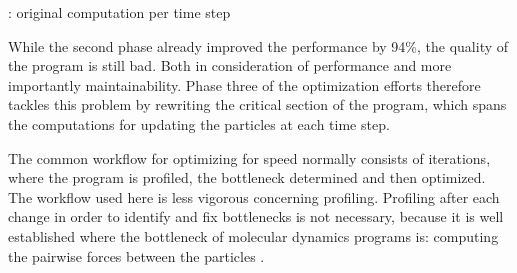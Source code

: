 \documentclass[twoside,11pt]{article}
\begin{document}
\begin{algorithm} %
  \caption{: original computation per time step}
  \label{alg:old}

  \begin{algorithmic}[1]
    \ENDFOR

    \ENDFOR

    \ENDFOR

    \ENDFOR

    \ENDFOR

    \ENDFOR

  \end{algorithmic}
\end{algorithm} %

While the second phase already improved the performance by 94\%,
the quality of the program is still bad.
Both in consideration of performance and more importantly
maintainability.
Phase three of the optimization efforts therefore tackles this
problem by rewriting the critical section of the program, which spans
the computations for updating the particles at each time step.

The common workflow for optimizing for speed normally consists of
iterations, where the program is profiled, the bottleneck determined
and then optimized.
The workflow used here is less vigorous concerning profiling.
Profiling after each change in order to identify and fix bottlenecks
is not necessary, because it is well established where the bottleneck
of molecular dynamics programs is: computing the pairwise forces
between the particles \citep{chiu_et_al_2011}.
\end{document}
